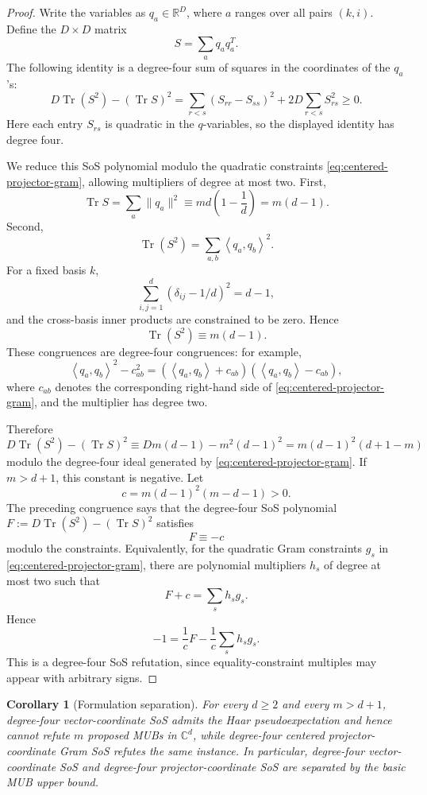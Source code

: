\documentclass[11pt]{article}
\newtheorem{corollary}[theorem]{Corollary}
\theoremstyle{remark}
\newcommand{\C}{\mathbb{C}}
\newcommand{\R}{\mathbb{R}}
\newcommand{\ip}[2]{\left\langle #1,#2\right\rangle}
\newcommand{\Tr}{\operatorname{Tr}}
\begin{document}
\begin{proof}
Write the variables as $q_a\in\R^D$, where $a$ ranges over all pairs $(k,i)$. Define the $D\times D$ matrix
\[
S=\sum_a q_aq_a^T.
\]
The following identity is a degree-four sum of squares in the coordinates of the $q_a$'s:
\[
D\Tr(S^2)-(\Tr S)^2
=
\sum_{r<s}(S_{rr}-S_{ss})^2+2D\sum_{r<s}S_{rs}^2\ge0.
\]
Here each entry $S_{rs}$ is quadratic in the $q$-variables, so the displayed identity has degree four.

We reduce this SoS polynomial modulo the quadratic constraints \eqref{eq:centered-projector-gram}, allowing multipliers of degree at most two. First,
\[
\Tr S=\sum_a \|q_a\|^2
\equiv md\left(1-\frac1d\right)=m(d-1).
\]
Second,
\[
\Tr(S^2)=\sum_{a,b}\ip{q_a}{q_b}^2.
\]
For a fixed basis $k$,
\[
\sum_{i,j=1}^d (\delta_{ij}-1/d)^2=d-1,
\]
and the cross-basis inner products are constrained to be zero. Hence
\[
\Tr(S^2)\equiv m(d-1).
\]
These congruences are degree-four congruences: for example,
\[
\ip{q_a}{q_b}^2-c_{ab}^2=(\ip{q_a}{q_b}+c_{ab})(\ip{q_a}{q_b}-c_{ab}),
\]
where $c_{ab}$ denotes the corresponding right-hand side of \eqref{eq:centered-projector-gram}, and the multiplier has degree two.

Therefore
\[
D\Tr(S^2)-(\Tr S)^2
\equiv Dm(d-1)-m^2(d-1)^2
=m(d-1)^2(d+1-m)
\]
modulo the degree-four ideal generated by \eqref{eq:centered-projector-gram}. If $m>d+1$, this constant is negative. Let
\[
c=m(d-1)^2(m-d-1)>0.
\]
The preceding congruence says that the degree-four SoS polynomial $F:=D\Tr(S^2)-(\Tr S)^2$ satisfies
\[
F\equiv -c
\]
modulo the constraints. Equivalently, for the quadratic Gram constraints $g_s$ in \eqref{eq:centered-projector-gram}, there are polynomial multipliers $h_s$ of degree at most two such that
\[
F+c=\sum_s h_s g_s.
\]
Hence
\[
-1=\frac1c F-\frac1c\sum_s h_s g_s.
\]
This is a degree-four SoS refutation, since equality-constraint multiples may appear with arbitrary signs.
\end{proof}

\begin{corollary}[Formulation separation]\label{cor:separation}
For every $d\ge2$ and every $m>d+1$, degree-four vector-coordinate SoS admits the Haar pseudoexpectation and hence cannot refute $m$ proposed MUBs in $\C^d$, while degree-four centered projector-coordinate Gram SoS refutes the same instance. In particular, degree-four vector-coordinate SoS and degree-four projector-coordinate SoS are separated by the basic MUB upper bound.
\end{corollary}
\end{document}
